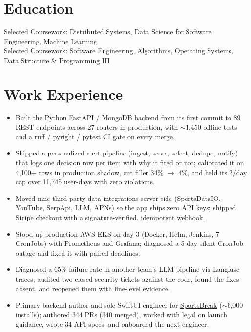 \documentclass[11pt, letterpaper]{article}
\begin{document}

\section{Education}
Selected Coursework: Distributed Systems, Data Science for Software Engineering, Machine Learning\\[1pt]
Selected Coursework: Software Engineering, Algorithms, Operating Systems, Data Structure \& Programming III

\section{Work Experience}
\begin{itemize}
  \item Built the Python FastAPI / MongoDB backend from its first commit to 89 REST endpoints across 27 routers in production, with $\sim$1{,}450 offline tests and a ruff / pyright / pytest CI gate on every merge.
  \item Shipped a personalized alert pipeline (ingest, score, select, dedupe, notify) that logs one decision row per item with why it fired or not; calibrated it on 4{,}100+ rows in production shadow, cut filler 34\% $\to$ 4\%, and held its 2/day cap over 11{,}745 user-days with zero violations.
  \item Moved nine third-party data integrations server-side (SportsDataIO, YouTube, SerpApi, LLM, APNs) so the app ships zero API keys; shipped Stripe checkout with a signature-verified, idempotent webhook.
  \item Stood up production AWS EKS on day 3 (Docker, Helm, Jenkins, 7 CronJobs) with Prometheus and Grafana; diagnosed a 5-day silent CronJob outage and fixed it with paired deadlines.
  \item Diagnosed a 65\% failure rate in another team's LLM pipeline via Langfuse traces; audited two closed security tickets against the code, found the fixes absent, and reopened them with line-level evidence.
  \item Primary backend author and sole SwiftUI engineer for \href{https://apps.apple.com/app/id6762649287}{SportsBreak} ($\sim$6{,}000 installs); authored 344 PRs (340 merged), worked with legal on launch guidance, wrote 34 API specs, and onboarded the next engineer.
\end{itemize}
\end{document}
